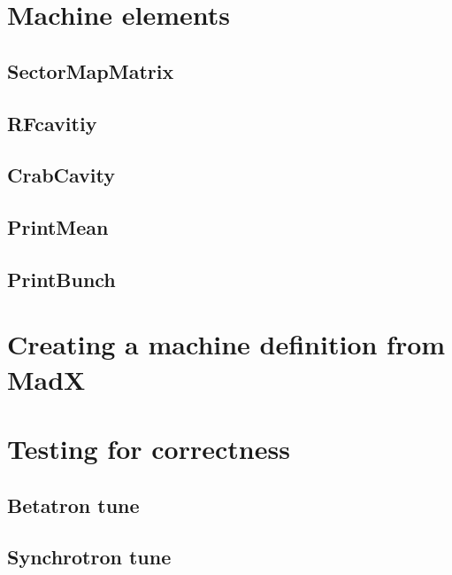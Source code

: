 \documentclass[a4paper]{report}
\begin{document}
\chapter{Machine elements}
\section{SectorMapMatrix}
\section{RFcavitiy}
\section{CrabCavity}
\section{PrintMean}
\section{PrintBunch}

\appendix
\chapter{Creating a machine definition from MadX}

\chapter{Testing for correctness}
\section{Betatron tune}

\section{Synchrotron tune}
\end{document}
